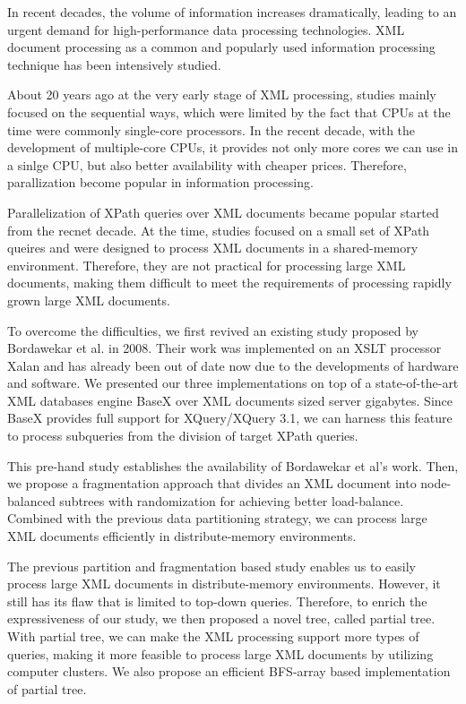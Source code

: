 \begin{abstracts}
	
	In recent decades, the volume of information increases dramatically, leading to
	an urgent demand for high-performance data processing technologies. XML document
	processing as a common and popularly used information processing technique has
	been intensively studied.
	
	About 20 years ago at the very early stage of XML processing, studies mainly
	focused on the sequential ways,  which were limited by the fact that CPUs at
	the time were commonly single-core processors. In the recent decade, with the
	development of multiple-core CPUs, it provides not only more cores we can use
	in a sinlge CPU, but also better availability with cheaper prices.  Therefore,
	parallization become popular in information processing.
	
	Parallelization of XPath queries over XML documents became popular started from
	the recnet decade. At the time, studies focused on a small set of XPath queires
	and were designed to process XML documents in a shared-memory environment.
	Therefore, they are not practical for processing large XML documents, making
	them difficult to meet the requirements of processing rapidly grown large XML
	documents.
	
	To overcome the difficulties, we first revived an existing study proposed by
	Bordawekar et al. in 2008. Their work was implemented on an XSLT processor Xalan
	and has already been out of date now due to the developments of hardware and
	software. We presented our three implementations on top of a state-of-the-art
	XML databases engine BaseX over XML documents sized server gigabytes. Since
	BaseX provides full support for XQuery/XQuery 3.1, we can harness this feature
	to process subqueries from the division of target XPath queries.
	
	This pre-hand study establishes the availability of Bordawekar et al's work.
	Then, we propose a fragmentation approach that divides an XML document into
	node-balanced subtrees with randomization for achieving better load-balance.
	Combined with the previous data partitioning strategy, we can process large XML
	documents efficiently in distribute-memory environments.
	
	The previous partition and fragmentation based study enables us to easily
	process large XML documents in distribute-memory environments. However, it
	still has its flaw that is limited to top-down queries. Therefore, to
	enrich the expressiveness of our study, we then proposed a novel tree, called
	partial tree. With partial tree, we can make the XML processing support more
	types of queries, making it more feasible to process large XML documents 
	by utilizing computer clusters. We also propose an efficient BFS-array based 
	implementation of partial tree.
	

\end{abstracts}
